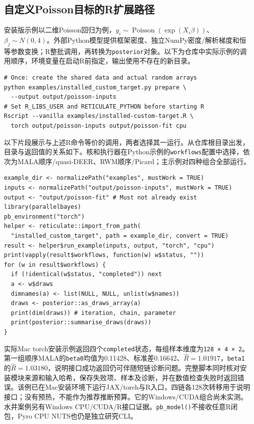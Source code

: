 \subsection{自定义Poisson目标的R扩展路径}
安装版示例以二维Poisson回归为例，$y_i\sim\operatorname{Poisson}(\exp(X_i\beta))$、$\beta_j\sim N(0,4)$。外部Python模型提供框架密度、独立NumPy密度/解析梯度和恒等参数变换；R整批调用，再转换为\texttt{posterior}对象。以下为仓库中实际示例的调用顺序，环境变量在启动R前指定，输出使用不存在的新目录。
\begingroup\small
\begin{verbatim}
# Once: create the shared data and actual random arrays
python examples/installed_custom_target.py prepare \
  --output output/poisson-inputs
# Set R_LIBS_USER and RETICULATE_PYTHON before starting R
Rscript --vanilla examples/installed-custom-target.R \
  torch output/poisson-inputs output/poisson-fit cpu
\end{verbatim}
\endgroup
以下片段展示与上述R命令等价的调用，两者选择其一运行。从仓库根目录出发，目录与返回值的关系如下。核和执行器在Python示例的\texttt{workflows}配置中选择，依次为MALA顺序/quasi-DEER、RWM顺序/Picard；主示例对四种组合全部运行。
\begingroup\small
\begin{verbatim}
example_dir <- normalizePath("examples", mustWork = TRUE)
inputs <- normalizePath("output/poisson-inputs", mustWork = TRUE)
output <- "output/poisson-fit" # Must not already exist
library(parallelbayes)
pb_environment("torch")
helper <- reticulate::import_from_path(
  "installed_custom_target", path = example_dir, convert = TRUE)
result <- helper$run_example(inputs, output, "torch", "cpu")
print(vapply(result$workflows, function(w) w$status, ""))
for (w in result$workflows) {
  if (!identical(w$status, "completed")) next
  a <- w$draws
  dimnames(a) <- list(NULL, NULL, unlist(w$names))
  draws <- posterior::as_draws_array(a)
  print(dim(draws)) # iteration, chain, parameter
  print(posterior::summarise_draws(draws))
}
\end{verbatim}
\endgroup
实际Mac torch安装示例返回四个\texttt{completed}状态，每组样本维度为\texttt{128 × 4 × 2}。第一组顺序MALA的\texttt{beta0}均值为0.11428、标准差0.16642、$\hat R=1.01917$，\texttt{beta1}的$\hat R=1.03180$，说明接口成功返回仍可伴随短链诊断问题。完整脚本同时核对安装模块来源和输入哈希，保存失败项、样本及诊断，并在数值检查失败时返回错误。该例已在Mac安装环境下运行JAX/torch与R入口，四链各128次转移用于说明接口；没有预热，不能作为推荐推断预算。它的Windows/CUDA组合尚未实测。水井案例另有Windows CPU/CUDA/R接口证据。\texttt{pb\_model()}不接收任意R闭包，Pyro CPU NUTS也仍是独立研究CLI。

